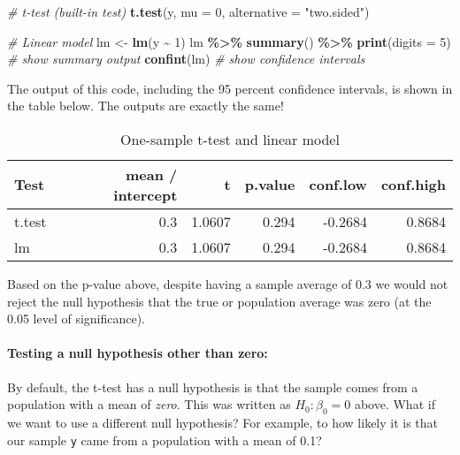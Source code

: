 \documentclass[
  12pt,
]{krantz}
\newenvironment{Shaded}{\begin{snugshade}}{\end{snugshade}}
\newcommand{\CommentTok}[1]{\textcolor[rgb]{0.56,0.35,0.01}{\textit{#1}}}
\newcommand{\DataTypeTok}[1]{\textcolor[rgb]{0.13,0.29,0.53}{#1}}
\newcommand{\DecValTok}[1]{\textcolor[rgb]{0.00,0.00,0.81}{#1}}
\newcommand{\KeywordTok}[1]{\textcolor[rgb]{0.13,0.29,0.53}{\textbf{#1}}}
\newcommand{\NormalTok}[1]{#1}
\newcommand{\OperatorTok}[1]{\textcolor[rgb]{0.81,0.36,0.00}{\textbf{#1}}}
\newcommand{\StringTok}[1]{\textcolor[rgb]{0.31,0.60,0.02}{#1}}
\begin{document}
\begin{Shaded}
\begin{Highlighting}[]
\CommentTok{\# t{-}test (built{-}in test)}
\KeywordTok{t.test}\NormalTok{(y, }\DataTypeTok{mu =} \DecValTok{0}\NormalTok{, }\DataTypeTok{alternative =} \StringTok{"two.sided"}\NormalTok{)}

\CommentTok{\# Linear model}
\NormalTok{lm \textless{}{-}}\StringTok{ }\KeywordTok{lm}\NormalTok{(y }\OperatorTok{\textasciitilde{}}\StringTok{ }\DecValTok{1}\NormalTok{)}
\NormalTok{  lm }\OperatorTok{\%\textgreater{}\%}\StringTok{ }\KeywordTok{summary}\NormalTok{() }\OperatorTok{\%\textgreater{}\%}\StringTok{ }\KeywordTok{print}\NormalTok{(}\DataTypeTok{digits =} \DecValTok{5}\NormalTok{) }\CommentTok{\# show summary output}
  \KeywordTok{confint}\NormalTok{(lm) }\CommentTok{\# show confidence intervals}
\end{Highlighting}
\end{Shaded}

The output of this code, including the 95 percent confidence intervals, is shown in the table below. The outputs are exactly the same!

\begin{table}

\caption{\label{tab:unnamed-chunk-20}One-sample t-test and linear model}
\centering
\begin{tabular}[t]{lrrrrr}
\toprule
Test & mean / intercept & t & p.value & conf.low & conf.high\\
\midrule
t.test & 0.3 & 1.0607 & 0.294 & -0.2684 & 0.8684\\
lm & 0.3 & 1.0607 & 0.294 & -0.2684 & 0.8684\\
\bottomrule
\end{tabular}
\end{table}

Based on the p-value above, despite having a sample average of 0.3 we would not reject the null hypothesis that the true or population average was zero (at the 0.05 level of significance).

\hypertarget{testing-a-null-hypothesis-other-than-zero}{%
\paragraph*{Testing a null hypothesis other than zero:}\label{testing-a-null-hypothesis-other-than-zero}}

By default, the t-test has a null hypothesis is that the sample comes from a population with a mean of \emph{zero}. This was written as \(H_0: \beta_0 = 0\) above. What if we want to use a different null hypothesis? For example, to how likely it is that our sample \texttt{y} came from a population with a mean of 0.1?
\end{document}
